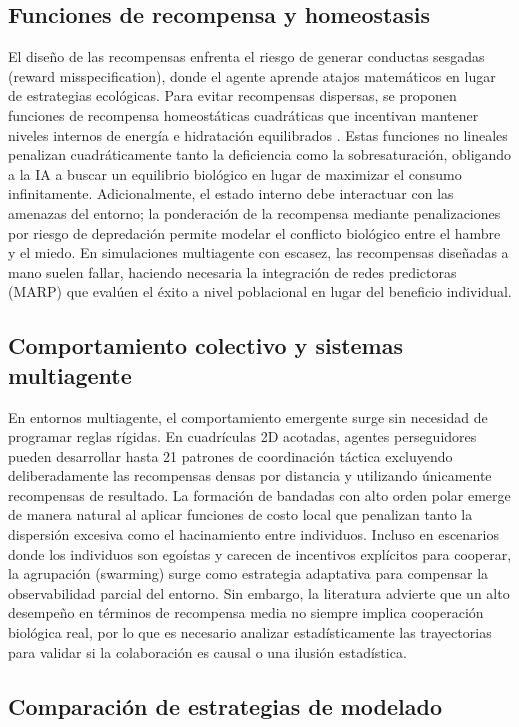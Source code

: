 \documentclass[conference]{IEEEtran}
\begin{document}
\subsection{Funciones de recompensa y homeostasis}
El diseño de las recompensas enfrenta el riesgo de generar conductas sesgadas 
(reward misspecification), donde el agente aprende atajos matemáticos en lugar 
de estrategias ecológicas. Para evitar recompensas dispersas, se proponen 
funciones de recompensa homeostáticas cuadráticas que incentivan mantener 
niveles internos de energía e hidratación equilibrados \cite{Paper2}. Estas 
funciones no lineales penalizan cuadráticamente tanto la deficiencia como la 
sobresaturación, obligando a la IA a buscar un equilibrio biológico en lugar 
de maximizar el consumo infinitamente. Adicionalmente, el estado interno debe 
interactuar con las amenazas del entorno; la ponderación de la recompensa 
mediante penalizaciones por riesgo de depredación permite modelar el conflicto 
biológico entre el hambre y el miedo. En simulaciones multiagente con escasez, 
las recompensas diseñadas a mano suelen fallar, haciendo necesaria la 
integración de redes predictoras (MARP) que evalúen el éxito a nivel 
poblacional en lugar del beneficio individual.

\subsection{Comportamiento colectivo y sistemas multiagente}
En entornos multiagente, el comportamiento emergente surge sin necesidad de 
programar reglas rígidas. En cuadrículas 2D acotadas, agentes perseguidores 
pueden desarrollar hasta 21 patrones de coordinación táctica excluyendo 
deliberadamente las recompensas densas por distancia y utilizando únicamente 
recompensas de resultado. La formación de bandadas con alto orden polar emerge 
de manera natural al aplicar funciones de costo local que penalizan tanto la 
dispersión excesiva como el hacinamiento entre individuos. Incluso en 
escenarios donde los individuos son egoístas y carecen de incentivos 
explícitos para cooperar, la agrupación (swarming) surge como estrategia 
adaptativa para compensar la observabilidad parcial del entorno. Sin embargo, 
la literatura advierte que un alto desempeño en términos de recompensa media 
no siempre implica cooperación biológica real, por lo que es necesario 
analizar estadísticamente las trayectorias para validar si la colaboración es 
causal o una ilusión estadística.

\subsection{Comparación de estrategias de modelado}
\end{document}
